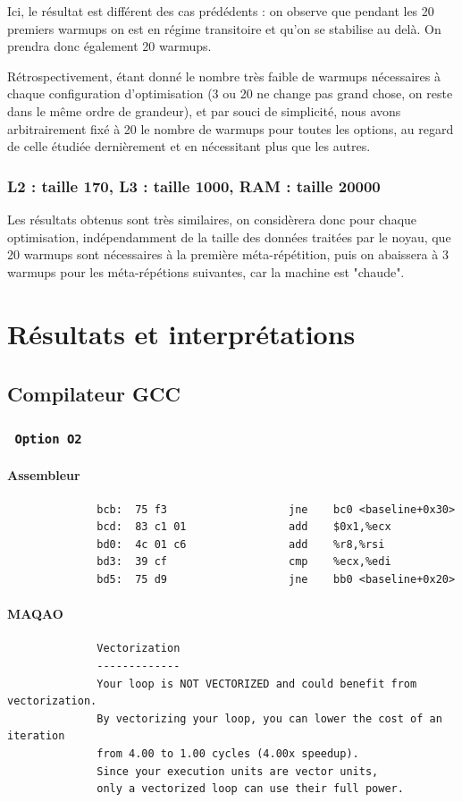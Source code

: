 \documentclass{report}
\begin{document}
	Ici, le résultat est différent des cas prédédents : on observe que pendant les 20 premiers warmups on est en régime transitoire et qu'on se stabilise au delà. On prendra donc également 20 warmups.

	Rétrospectivement, étant donné le nombre très faible de warmups nécessaires à chaque configuration d'optimisation (3 ou 20 ne change pas grand chose, on reste dans le même ordre de grandeur), et par souci de simplicité, nous avons arbitrairement fixé à 20 le nombre de warmups pour toutes les options, au regard de celle étudiée dernièrement et en nécessitant plus que les autres.

    \subsubsection{L2 : taille 170, L3 : taille 1000, RAM : taille 20000}
    Les résultats obtenus sont très similaires, on considèrera donc pour chaque optimisation, indépendamment de la taille des données traitées par le noyau, que 20 warmups sont nécessaires à la première méta-répétition, puis on abaissera à 3 warmups pour les méta-répétions suivantes, car la machine est "chaude".
\newpage
\section{Résultats et interprétations}
    \subsection{Compilateur GCC\textsuperscript \textcopyleft  }
      \subsubsection{ \texttt{ Option O2 } }
          \paragraph{Assembleur}
            \begin{verbatim}
              bcb:	75 f3                	jne    bc0 <baseline+0x30>
              bcd:	83 c1 01             	add    $0x1,%ecx
              bd0:	4c 01 c6             	add    %r8,%rsi
              bd3:	39 cf                	cmp    %ecx,%edi
              bd5:	75 d9                	jne    bb0 <baseline+0x20>
            \end{verbatim}
          \paragraph{MAQAO}
            \begin{verbatim}
              Vectorization
              -------------
              Your loop is NOT VECTORIZED and could benefit from vectorization.
              By vectorizing your loop, you can lower the cost of an iteration
              from 4.00 to 1.00 cycles (4.00x speedup).
              Since your execution units are vector units,
              only a vectorized loop can use their full power.
            \end{verbatim}
\end{document}
